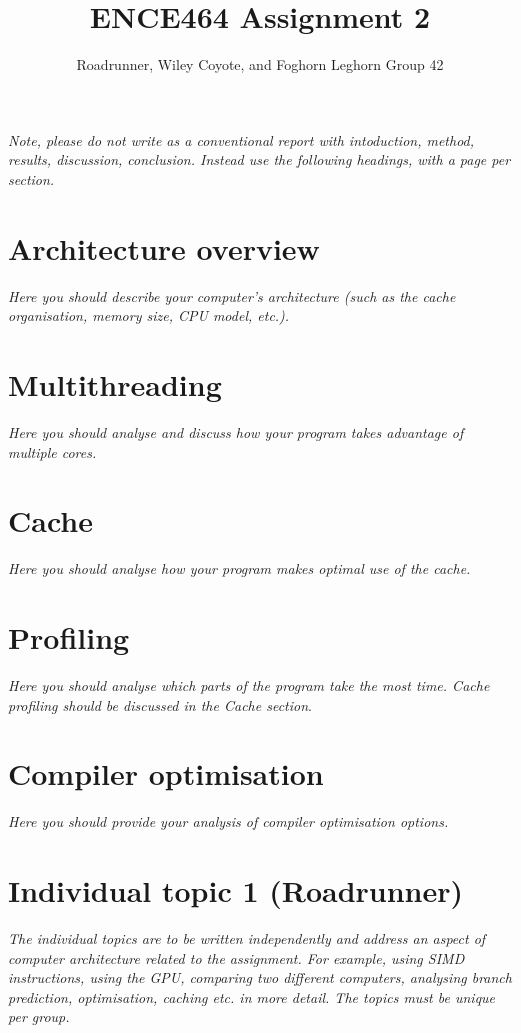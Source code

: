\documentclass[a4paper,12pt]{article}
\title{ENCE464 Assignment 2}
\author{Roadrunner, Wiley Coyote, and Foghorn Leghorn Group 42}
\date{}
\newcommand{\comment}[1]{\emph{\color{blue}#1}}
\begin{document}
\maketitle

\comment{Note, please do not write as a conventional report with
  intoduction, method, results, discussion, conclusion.  Instead use
  the following headings, with a page per section.}


\section{Architecture overview}

\comment{Here you should describe your computer's architecture (such
  as the cache organisation, memory size, CPU model, etc.).}


\section{Multithreading}

\comment{Here you should analyse and discuss how your program takes
  advantage of multiple cores.}


\section{Cache}

\comment{Here you should analyse how your program makes optimal use
  of the cache.}


\section{Profiling}

\comment{Here you should analyse which parts of the program take the
  most time.  Cache profiling should be discussed in the Cache
  section}.


\section{Compiler optimisation}

\comment{Here you should provide your analysis of compiler
  optimisation options.}


\section{Individual topic 1 (Roadrunner)}

\comment{The individual topics are to be written independently and
  address an aspect of computer architecture related to the
  assignment.  For example, using SIMD instructions, using the GPU,
  comparing two different computers, analysing branch prediction,
  optimisation, caching etc. in more detail.  The topics must be
  unique per group.}
\end{document}

